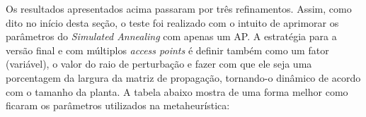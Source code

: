 \documentclass[
	12pt,				%
	openright,			%
	twoside,			%
	a4paper,			%
	english,			%
	french,				%
	spanish,			%
	brazil				%
	]{abntex2}
\begin{document}
Os resultados apresentados acima passaram por três refinamentos. Assim, como dito no início desta seção, o teste foi realizado com o intuito de aprimorar os parâmetros do \textit{Simulated Annealing} com apenas um AP. A estratégia para a versão final e com múltiplos \textit{access points} é definir também como um fator (variável), o valor do raio de perturbação e fazer com que ele seja uma porcentagem da largura da matriz de propagação, tornando-o dinâmico de acordo com o tamanho da planta. A tabela abaixo mostra de uma forma melhor como ficaram os parâmetros utilizados na metaheurística:

\begin{table}[]
	\centering
	\caption{Parâmetros definitivos utilizados na metaheurística}
	\label{parametros_metaheuristica}
\end{table}
\end{document}
